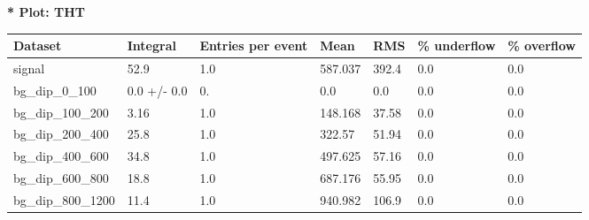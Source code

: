 \documentclass[a4paper, 10pt]{article}
\begin{document}
\textbf{* Plot: THT}\\
   \begin{table}[H]
  \begin{center}
    \begin{tabular}{|m{23.0mm}|m{23.0mm}|m{18.0mm}|m{19.0mm}|m{19.0mm}|m{19.0mm}|m{19.0mm}|}
      \hline
      {\cellcolor{yellow}         Dataset}& {\cellcolor{yellow}         Integral}& {\cellcolor{yellow}         Entries per event}& {\cellcolor{yellow}         Mean}& {\cellcolor{yellow}         RMS}& {\cellcolor{yellow}         \% underflow}& {\cellcolor{yellow}         \% overflow}\\
      \hline
      {\cellcolor{white}         signal}& {\cellcolor{white}         52.9}& {\cellcolor{white}         1.0}& {\cellcolor{white}         587.037}& {\cellcolor{white}         392.4}& {\cellcolor{green}         0.0}& {\cellcolor{green}         0.0}\\
      \hline
      {\cellcolor{white}         bg\_dip\_0\_100}& {\cellcolor{white}         0.0 +/\-- 0.0}& {\cellcolor{white}         0.}& {\cellcolor{white}         0.0}& {\cellcolor{white}         0.0}& {\cellcolor{green}         0.0}& {\cellcolor{green}         0.0}\\
      \hline
      {\cellcolor{white}         bg\_dip\_100\_200}& {\cellcolor{white}         3.16}& {\cellcolor{white}         1.0}& {\cellcolor{white}         148.168}& {\cellcolor{white}         37.58}& {\cellcolor{green}         0.0}& {\cellcolor{green}         0.0}\\
      \hline
      {\cellcolor{white}         bg\_dip\_200\_400}& {\cellcolor{white}         25.8}& {\cellcolor{white}         1.0}& {\cellcolor{white}         322.57}& {\cellcolor{white}         51.94}& {\cellcolor{green}         0.0}& {\cellcolor{green}         0.0}\\
      \hline
      {\cellcolor{white}         bg\_dip\_400\_600}& {\cellcolor{white}         34.8}& {\cellcolor{white}         1.0}& {\cellcolor{white}         497.625}& {\cellcolor{white}         57.16}& {\cellcolor{green}         0.0}& {\cellcolor{green}         0.0}\\
      \hline
      {\cellcolor{white}         bg\_dip\_600\_800}& {\cellcolor{white}         18.8}& {\cellcolor{white}         1.0}& {\cellcolor{white}         687.176}& {\cellcolor{white}         55.95}& {\cellcolor{green}         0.0}& {\cellcolor{green}         0.0}\\
      \hline
      {\cellcolor{white}         bg\_dip\_800\_1200}& {\cellcolor{white}         11.4}& {\cellcolor{white}         1.0}& {\cellcolor{white}         940.982}& {\cellcolor{white}         106.9}& {\cellcolor{green}         0.0}& {\cellcolor{green}         0.0}\\

\end{tabular}
\end{center}
\end{table}
\end{document}
